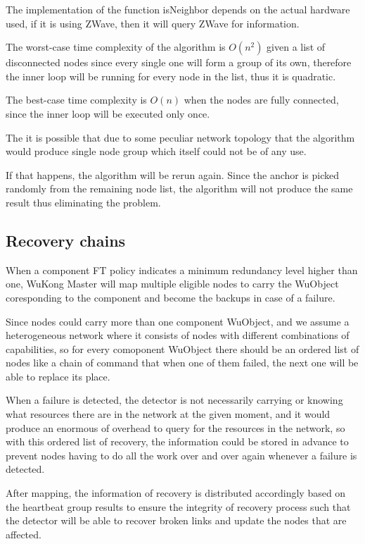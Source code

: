 The implementation of the function isNeighbor depends on the actual hardware
used, if it is using ZWave, then it will query ZWave for information.

The worst-case time complexity of the algorithm is $O(n^2)$ given a list of
disconnected nodes since every single one will form a group of its own,
therefore the inner loop will be running for every node in the list, thus it is
quadratic.

The best-case time complexity is $O(n)$ when the nodes are fully
connected, since the inner loop will be executed only once.

The it is possible that due to some peculiar network topology that the
algorithm would produce single node group which itself could not be of any use.

If that happens, the algorithm will be rerun again. Since the anchor is picked
randomly from the remaining node list, the algorithm will not produce the same
result thus eliminating the problem.

\subsection{Recovery chains}

When a component FT policy indicates a minimum redundancy level higher than
one, WuKong Master will map multiple eligible nodes to carry the WuObject
coresponding to the component and become the backups in case of a failure.

Since nodes could carry more than one component WuObject, and we assume
a heterogeneous network where it consists of nodes with different combinations
of capabilities, so for every comoponent WuObject there should be an ordered
list of nodes like a chain of command that when one of them failed, the next
one will be able to replace its place.

When a failure is detected, the detector is not necessarily carrying or knowing
what resources there are in the network at the given moment, and it would
produce an enormous of overhead to query for the resources in the network, so
with this ordered list of recovery, the information could be stored in advance
to prevent nodes having to do all the work over and over again whenever
a failure is detected. 

After mapping, the information of recovery is distributed accordingly based on
the heartbeat group results to ensure the integrity of recovery process such
that the detector will be able to recover broken links and update the nodes
that are affected.

